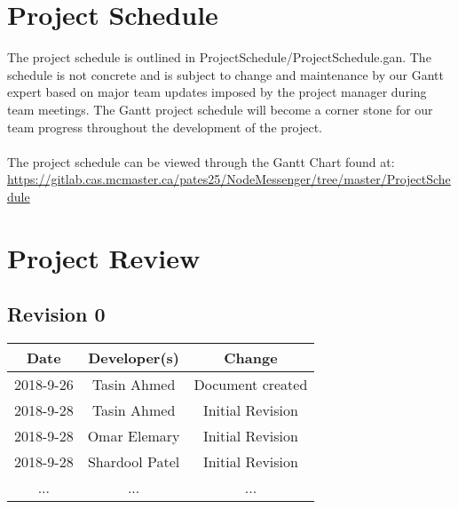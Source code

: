 \documentclass{article}
\begin{document}
\section{Project Schedule}
The project schedule is outlined in ProjectSchedule/ProjectSchedule.gan. The schedule is not concrete and is subject to change and maintenance by our Gantt expert based on major team updates imposed by the project manager during team meetings. The Gantt project schedule will become a corner stone for our team progress throughout the development of the project.\\
\\
The project schedule can be viewed through the Gantt Chart found at:\\
\url{https://gitlab.cas.mcmaster.ca/pates25/NodeMessenger/tree/master/ProjectSchedule}

\section{Project Review}
\subsection{Revision 0}

\begin{center}
	\begin{tabular}{ccc}
		\hline 
		Date & Developer(s) & Change \\ 
		\hline 
		2018-9-26 & Tasin Ahmed & Document created \\ 
		2018-9-28 & Tasin Ahmed & Initial Revision  \\
		2018-9-28 & Omar Elemary & Initial Revision  \\ 
		2018-9-28 & Shardool Patel & Initial Revision  \\ 
		... & ... & ...  \\ 
		\hline 
	\end{tabular} 
\end{center}
\end{document}
